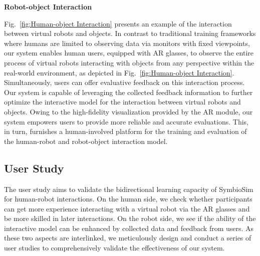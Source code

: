 \textbf{Robot-object Interaction} 
 
Fig.~\ref{fig:Human-object Interaction} presents an example of the interaction between virtual robots and objects. In contrast to traditional training frameworks where humans are limited to observing data via monitors with fixed viewpoints, our system enables human users, equipped with AR glasses, to observe the entire process of virtual robots interacting with objects from any perspective within the real-world environment, as depicted in Fig.~\ref{fig:Human-object Interaction}.
Simultaneously, users can offer evaluative feedback on this interaction process. Our system is capable of leveraging the collected feedback information to further optimize the interactive model for the interaction between virtual robots and objects. Owing to the high-fidelity visualization provided by the AR module, our system empowers users to provide more reliable and accurate evaluations. This, in turn, furnishes a human-involved platform for the training and evaluation of the human-robot and robot-object interaction model.





\subsection{User Study}

The user study aims to validate the bidirectional learning capacity of SymbioSim for human-robot interactions. On the human side, we check whether participants can get more experience interacting with a virtual robot via the AR glasses and be more skilled in later interactions. On the robot side, we see if the ability of the interactive model can be enhanced by collected data and feedback from users. As these two aspects are interlinked, we meticulously design and conduct a series of user studies to comprehensively validate the effectiveness of our system.


